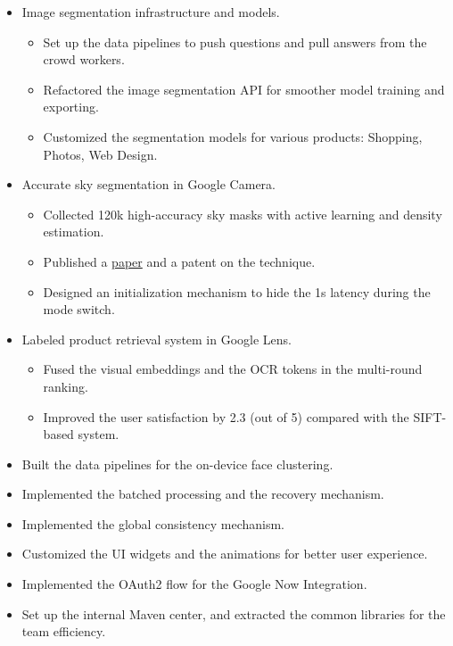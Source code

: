 \documentclass[letterpaper,11pt]{article}
\begin{document}
\begin{itemize}
  \begin{itemize}
    
    \item Image segmentation infrastructure and models.
    \begin{itemize}
      \item Set up the data pipelines to push questions and pull answers from the crowd workers.
      \item Refactored the image segmentation API for smoother model training and exporting.
      \item Customized the segmentation models for various products: Shopping, Photos, Web Design.
    \end{itemize}
    
    \item Accurate sky segmentation in Google Camera.
    \begin{itemize}
      \item Collected 120k high-accuracy sky masks with active learning and density estimation.
      \item Published a \href{https://google.github.io/sky-optimization/}{paper} and a patent on the technique.
      \item Designed an initialization mechanism to hide the 1s latency during the mode switch.
    \end{itemize}
    
    \item Labeled product retrieval system in Google Lens.
    \begin{itemize}
      \item Fused the visual embeddings and the OCR tokens in the multi-round ranking.
      \item Improved the user satisfaction by 2.3 (out of 5) compared with the SIFT-based system.
    \end{itemize}
  \end{itemize}

  \begin{itemize}
  \item Built the data pipelines for the on-device face clustering.
  \item Implemented the batched processing and the recovery mechanism.
  \item Implemented the global consistency mechanism.
  \end{itemize}

  \begin{itemize}
  \item Customized the UI widgets and the animations for better user experience.
  \item Implemented the OAuth2 flow for the Google Now Integration.
  \item Set up the internal Maven center, and extracted the common libraries for the team efficiency.
  \end{itemize}
\end{itemize}
\end{document}
